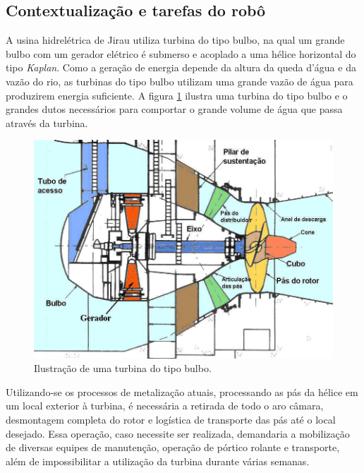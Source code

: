 \subsection{Contextualização e tarefas do robô}

A usina hidrelétrica de Jirau utiliza turbina do tipo bulbo, na qual um grande
bulbo com um gerador elétrico é submerso e acoplado a uma hélice horizontal do
tipo \textit{Kaplan}. Como a geração de energia depende da altura da queda
d'água e da vazão do rio, as turbinas do tipo bulbo utilizam uma grande vazão de
água para produzirem energia suficiente. A figura \ref{fig::bulb_turbine}
ilustra uma turbina do tipo bulbo e o grandes dutos necessários para comportar o
grande volume de água que passa através da turbina. 

\begin{figure}[h!]	
	\includegraphics[width=\columnwidth]{figs/intro/bulb_turbine}
	\caption{Ilustração de uma turbina do tipo bulbo.}
	\label{fig::bulb_turbine}
\end{figure}

Utilizando-se os processos de metalização atuais, processando as pás da hélice
em um local exterior à turbina, é necessária a retirada de todo o aro câmara,
desmontagem completa do rotor e logística de transporte das pás até o local
desejado. Essa operação, caso necessite ser realizada, demandaria a mobilização
de diversas equipes de manutenção, operação de pórtico rolante e transporte,
além de impossibilitar a utilização da turbina durante várias semanas.

